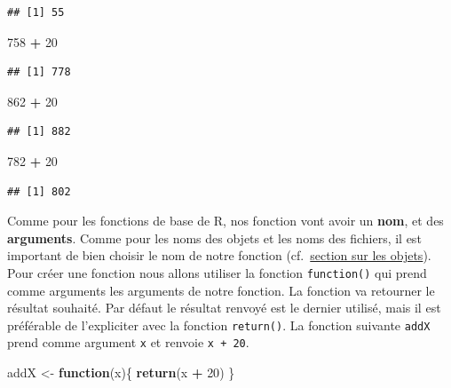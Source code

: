 \documentclass[]{book}
\newenvironment{Shaded}{\begin{snugshade}}{\end{snugshade}}
\newcommand{\ControlFlowTok}[1]{\textcolor[rgb]{0.13,0.29,0.53}{\textbf{#1}}}
\newcommand{\DecValTok}[1]{\textcolor[rgb]{0.00,0.00,0.81}{#1}}
\newcommand{\KeywordTok}[1]{\textcolor[rgb]{0.13,0.29,0.53}{\textbf{#1}}}
\newcommand{\NormalTok}[1]{#1}
\newcommand{\OperatorTok}[1]{\textcolor[rgb]{0.81,0.36,0.00}{\textbf{#1}}}
\newcommand{\StringTok}[1]{\textcolor[rgb]{0.31,0.60,0.02}{#1}}
\begin{document}
\begin{verbatim}
## [1] 55
\end{verbatim}

\begin{Shaded}
\begin{Highlighting}[]
\DecValTok{758} \OperatorTok{+}\StringTok{ }\DecValTok{20}
\end{Highlighting}
\end{Shaded}

\begin{verbatim}
## [1] 778
\end{verbatim}

\begin{Shaded}
\begin{Highlighting}[]
\DecValTok{862} \OperatorTok{+}\StringTok{ }\DecValTok{20}
\end{Highlighting}
\end{Shaded}

\begin{verbatim}
## [1] 882
\end{verbatim}

\begin{Shaded}
\begin{Highlighting}[]
\DecValTok{782} \OperatorTok{+}\StringTok{ }\DecValTok{20}
\end{Highlighting}
\end{Shaded}

\begin{verbatim}
## [1] 802
\end{verbatim}

Comme pour les fonctions de base de R, nos fonction vont avoir un \textbf{nom}, et des \textbf{arguments}. Comme pour les noms des objets et les noms des fichiers, il est important de bien choisir le nom de notre fonction (cf.~\protect\hyperlink{l011object}{section sur les objets}). Pour créer une fonction nous allons utiliser la fonction \texttt{function()} qui prend comme arguments les arguments de notre fonction. La fonction va retourner le résultat souhaité. Par défaut le résultat renvoyé est le dernier utilisé, mais il est préférable de l'expliciter avec la fonction \texttt{return()}. La fonction suivante \texttt{addX} prend comme argument \texttt{x} et renvoie \texttt{x\ +\ 20}.

\begin{Shaded}
\begin{Highlighting}[]
\NormalTok{addX <-}\StringTok{ }\ControlFlowTok{function}\NormalTok{(x)\{}
  \KeywordTok{return}\NormalTok{(x }\OperatorTok{+}\StringTok{ }\DecValTok{20}\NormalTok{)}
\NormalTok{\}}
\end{Highlighting}
\end{Shaded}
\end{document}
